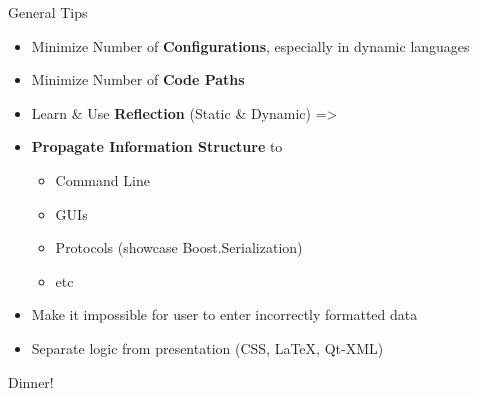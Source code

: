 \documentclass[xcolor=dvipsnames]{beamer}
\begin{document}
\begin{frame}[fragile]{General Tips}
  \begin{itemize}[<+->]
  \item Minimize Number of \textbf{Configurations}, especially in dynamic languages
  \item Minimize Number of \textbf{Code Paths}
  \item Learn \& Use \textbf{Reflection} (Static \& Dynamic) =>
  \item \textbf{Propagate Information Structure} to
    \begin{itemize}[<+->]
    \item Command Line
    \item GUIs
    \item Protocols (showcase Boost.Serialization)
    \item etc
    \end{itemize}
  \item Make it impossible for user to enter incorrectly formatted data
  \item Separate logic from presentation (CSS, LaTeX, Qt-XML)
  \end{itemize}
\end{frame}

\begin{frame}[fragile]{Dinner!}
  \begin{figure}
  \end{figure}
\end{frame}
\end{document}
